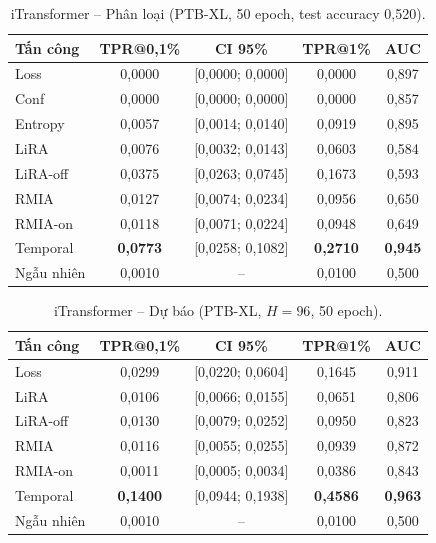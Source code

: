 \documentclass[12pt,a4paper]{report}
\begin{document}
\begin{table}[H]
\centering
\caption{iTransformer -- Phân loại (PTB-XL, 50 epoch, test accuracy 0,520).}
\label{tab:itrans_cls}
\begin{tabular}{lcccc}
\toprule
\textbf{Tấn công} & \textbf{TPR@0,1\%} & \textbf{CI 95\%} & \textbf{TPR@1\%} & \textbf{AUC} \\
\midrule
Loss      & 0,0000 & [0,0000; 0,0000] & 0,0000 & 0,897 \\
Conf      & 0,0000 & [0,0000; 0,0000] & 0,0000 & 0,857 \\
Entropy   & 0,0057 & [0,0014; 0,0140] & 0,0919 & 0,895 \\
LiRA      & 0,0076 & [0,0032; 0,0143] & 0,0603 & 0,584 \\
LiRA-off  & 0,0375 & [0,0263; 0,0745] & 0,1673 & 0,593 \\
RMIA      & 0,0127 & [0,0074; 0,0234] & 0,0956 & 0,650 \\
RMIA-on   & 0,0118 & [0,0071; 0,0224] & 0,0948 & 0,649 \\
Temporal  & \textbf{0,0773} & [0,0258; 0,1082] & \textbf{0,2710} & \textbf{0,945} \\
\midrule
Ngẫu nhiên & 0,0010 & -- & 0,0100 & 0,500 \\
\bottomrule
\end{tabular}
\end{table}

\begin{table}[H]
\centering
\caption{iTransformer -- Dự báo (PTB-XL, $H = 96$, 50 epoch).}
\label{tab:itrans_fcst}
\begin{tabular}{lcccc}
\toprule
\textbf{Tấn công} & \textbf{TPR@0,1\%} & \textbf{CI 95\%} & \textbf{TPR@1\%} & \textbf{AUC} \\
\midrule
Loss      & 0,0299 & [0,0220; 0,0604] & 0,1645 & 0,911 \\
LiRA      & 0,0106 & [0,0066; 0,0155] & 0,0651 & 0,806 \\
LiRA-off  & 0,0130 & [0,0079; 0,0252] & 0,0950 & 0,823 \\
RMIA      & 0,0116 & [0,0055; 0,0255] & 0,0939 & 0,872 \\
RMIA-on   & 0,0011 & [0,0005; 0,0034] & 0,0386 & 0,843 \\
Temporal  & \textbf{0,1400} & [0,0944; 0,1938] & \textbf{0,4586} & \textbf{0,963} \\
\midrule
Ngẫu nhiên & 0,0010 & -- & 0,0100 & 0,500 \\
\bottomrule
\end{tabular}
\end{table}
\end{document}
